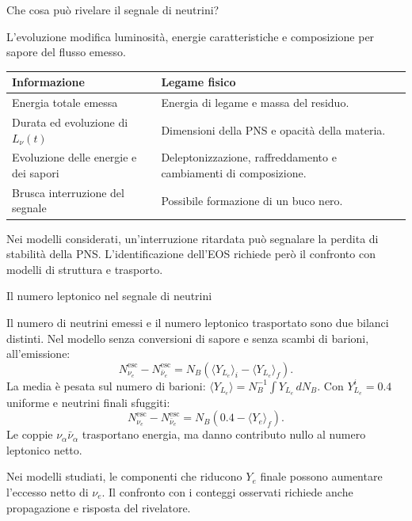 \begin{frame}[t,label=pns-completa-19]{Che cosa pu\`o rivelare il segnale di neutrini?}
\small\raggedright
L'evoluzione modifica luminosit\`a, energie caratteristiche
e composizione per sapore del flusso emesso.
\medskip
{\renewcommand{\arraystretch}{1.2}
\begin{tabular}{|p{}|p{}|}
\hline
\textbf{Informazione} & \textbf{Legame fisico} \\
\hline
Energia totale emessa & Energia di legame e massa del residuo. \\
\hline
\raggedright Durata ed evoluzione di $L_\nu(t)$ & Dimensioni della PNS
e opacit\`a della materia. \\
\hline
Evoluzione delle energie e dei sapori & Deleptonizzazione,
raffreddamento e cambiamenti di composizione. \\
\hline
Brusca interruzione del segnale & Possibile formazione
di un buco nero. \\
\hline
\end{tabular}}
\medskip
Nei modelli considerati, un'interruzione ritardata
pu\`o segnalare la perdita di stabilit\`a della PNS.
L'identificazione dell'EOS richiede per\`o il confronto
con modelli di struttura e trasporto.
\end{frame}

\begin{frame}[t,label=pns-completa-20]{Il numero leptonico nel segnale di neutrini}
\small\raggedright
Il numero di neutrini emessi e il numero leptonico trasportato
sono due bilanci distinti. Nel modello senza conversioni di
sapore e senza scambi di barioni, all'emissione:
\[
 \boxed{N_{\nu_e}^{\mathrm{esc}}-N_{\bar\nu_e}^{\mathrm{esc}}
 =N_B\left(\langle Y_{L_e}\rangle_i
 -\langle Y_{L_e}\rangle_f\right)}.
\]
La media \`e pesata sul numero di barioni:
$\langle Y_{L_e}\rangle=N_B^{-1}\int Y_{L_e}\,dN_B$.
Con $Y_{L_e}^{i}=0.4$ uniforme e neutrini finali sfuggiti:
\[
 N_{\nu_e}^{\mathrm{esc}}-N_{\bar\nu_e}^{\mathrm{esc}}
 =N_B\left(0.4-\langle Y_e\rangle_f\right).
\]
Le coppie $\nu_\alpha\bar\nu_\alpha$ trasportano energia,
ma danno contributo nullo al numero leptonico netto.

\medskip
Nei modelli studiati, le componenti che riducono $Y_e$ finale
possono aumentare l'eccesso netto di $\nu_e$.
Il confronto con i conteggi osservati richiede anche
propagazione e risposta del rivelatore.

\end{frame}

